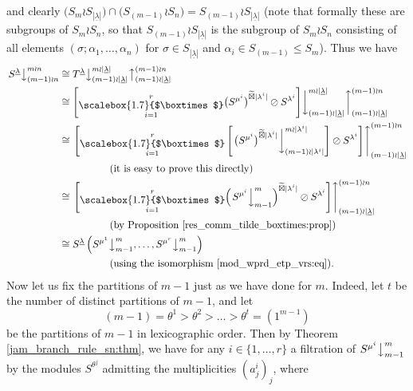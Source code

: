 \documentclass[10pt]{article}
\theoremstyle{definition}
\DeclareMathOperator*{\bigboxtimes}{\raisebox{-3pt}{\scalebox{1.7}{$\boxtimes$}}}
\newcommand{\ul}[1]{\underline{#1}}
\begin{document}
and clearly $\bigl(S_m \wr S_{|\ul{\lambda}|}\bigr) \cap \bigl(S_{(m-1)} \wr S_n\bigr) = S_{(m-1)} \wr S_{|\ul{\lambda}|}$ (note that formally these
are subgroups of $S_m \wr S_n$, so that $S_{(m-1)} \wr S_{|\ul{\lambda}|}$ is the subgroup of $S_m \wr S_n$ consisting of all elements
$(\sigma;\alpha_1,\ldots,\alpha_n)$ for $\sigma \in S_{|\ul{\lambda}|}$ and $\alpha_i \in S_{(m-1)} \leqslant S_m$). Thus we have
\begin{align*}
\left.S^{\ul{\lambda}}\right\downarrow^{m \wr n}_{(m-1) \wr n}
&\cong T^{\ul{\lambda}}
\bigl\downarrow^{m{\wr}|\ul{\lambda}|}_{(m-1){\wr}|\ul{\lambda}|}
\bigl\uparrow^{(m-1) \wr n}_{(m-1){\wr}|\ul{\lambda}|}\\
&\cong
\left[\bigboxtimes^r_{i=1} \bigl(S^{\mu^i}\bigr)^{\widetilde\boxtimes |\lambda^i|}\oslash S^{\lambda^i}\right]
\biggr\downarrow^{m{\wr}|\ul{\lambda}|}_{(m-1){\wr}|\ul{\lambda}|}
\biggr\uparrow^{(m-1) \wr n}_{(m-1){\wr}|\ul{\lambda}|}\\
&\cong
\left.\left[
\bigboxtimes^r_{i=1} \left[\left.\bigl(S^{\mu^i}\bigr)^{\widetilde\boxtimes |\lambda^i|}
\right\downarrow^{m \wr |\lambda^i|}_{(m-1) \wr |\lambda^i|}\right]
\oslash S^{\lambda^i}\right]\right\uparrow^{(m-1) \wr n}_{(m-1){\wr}|\ul{\lambda}|}\\
&\hspace{5em}\text{(it is easy to prove this directly)}\\
&\cong
\left.\left[
\bigboxtimes^r_{i=1} \Bigl(\left.S^{\mu^i}\right\downarrow^{m}_{m-1}\Bigr)^{\widetilde\boxtimes |\lambda^i|}
\oslash S^{\lambda^i}\right]\right\uparrow^{(m-1) \wr n}_{(m-1){\wr}|\ul{\lambda}|}\\
&\hspace{5em}\text{(by Proposition \ref{res_comm_tilde_boxtimes:prop})}\\
&\cong
S^{\ul{\lambda}}\left(S^{\mu^1}\bigr\downarrow^m_{m-1},\ldots,S^{\mu^r}\bigr\downarrow^m_{m-1}\right)\\
&\hspace{5em}\text{(using the isomorphism \eqref{mod_wprd_etp_vrs:eq}).}
\end{align*}
Now let us fix the partitions of $m-1$ just as we have done for $m$. Indeed, let $t$ be the number of distinct partitions of $m-1$, and
let
\[ (m-1) = \theta^1 > \theta^2 > \ldots > \theta^t = (1^{m-1}) \]
be the partitions of $m-1$ in lexicographic order. Then by Theorem \ref{jam_branch_rule_sn:thm}, we have for any $i \in \{1,\ldots,r\}$
a filtration of $S^{\mu^i}\bigr\downarrow^{m}_{m-1}$ by the modules $S^{\theta^j}$ admitting the multiplicities $(a^i_j)_j$, where
\end{document}
